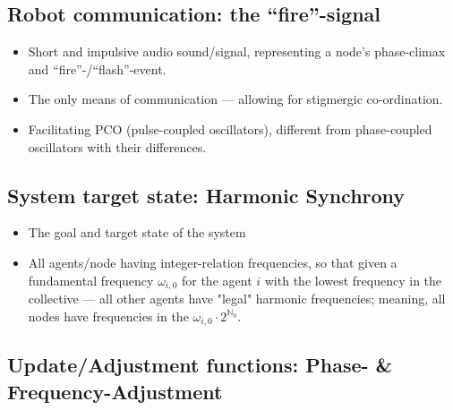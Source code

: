 	\subsection{Robot communication: the ``fire''-signal}
	\label{subsec:fire_signal}
		\begin{itemize}
			\item Short and impulsive audio sound/signal, representing a node's phase-climax and ``fire''-/``flash''-event.
			\item The only means of communication — allowing for stigmergic co-ordination.
			\item Facilitating PCO (pulse-coupled oscillators), different from phase-coupled oscillators with their differences.
		\end{itemize}


	\subsection{System target state: Harmonic Synchrony}
	\label{subsec:harmonic_synchrony}
		\begin{itemize}
			\item The goal and target state of the system
			\item All agents/node having integer-relation frequencies, so that given a fundamental frequency $\omega_{i,0}$ for the agent $i$ with the lowest frequency in the collective — all other agents have "legal" harmonic frequencies; meaning, all nodes have frequencies in the  $\omega_{i,0} \cdot 2^{\mathbb{N}_0}$.
		\end{itemize}
	
	
	\subsection{Update/Adjustment functions: Phase- \& Frequency-Adjustment}
	\label{subsec:update_functions}
	
